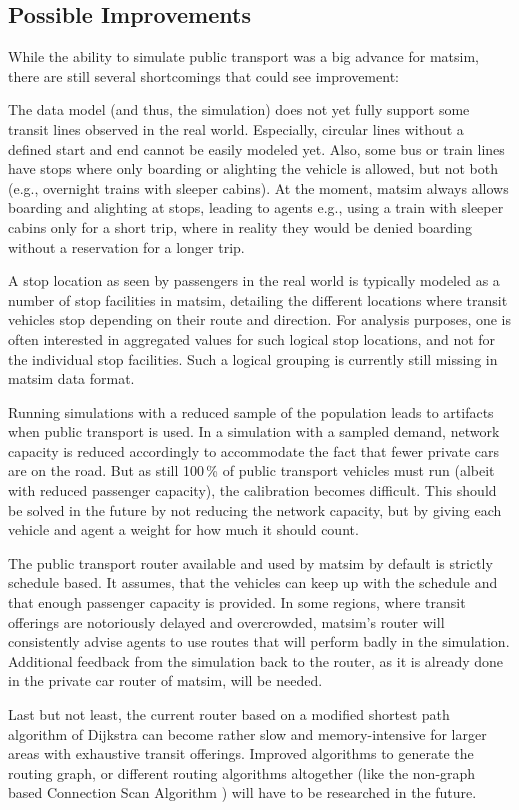 \subsection{Possible Improvements}
While the ability to simulate public transport was a big advance for \gls{matsim},
there are still several shortcomings that could see improvement:
%
\begin{compactitem}
	\item The data model (and thus, the simulation) does not yet fully support some
	transit lines observed in the real world. Especially, circular lines without a
	defined start and end cannot be easily modeled yet. Also, some bus or
	train lines have stops where only boarding or alighting the vehicle is allowed,
	but not both (e.g., overnight trains with sleeper cabins). At the moment, \gls{matsim}
	always allows boarding and alighting at stops, leading to agents e.g., using a
	train with sleeper cabins only for a short trip, where in reality they would be
	denied boarding without a reservation for a longer trip.
	\item A stop location as seen by passengers in the real world is
	typically modeled as a number of stop facilities in \gls{matsim}, detailing the
	different locations where transit vehicles stop depending on their route and
	direction. For analysis purposes, one is often interested in aggregated values
	for such logical stop locations, and not for the individual stop facilities.
	Such a logical grouping is currently still missing in \gls{matsim} data format.
	\item Running simulations with a reduced sample of the population leads to
	artifacts when public transport is used. In a simulation with a sampled demand,
	network capacity is reduced accordingly to accommodate the fact that fewer
	private cars are on the road. But as still 100\,\% of public transport vehicles
	must run (albeit with reduced passenger capacity), the calibration becomes
	difficult. This should be solved in the future by not reducing the network
	capacity, but by giving each vehicle and agent a weight for how much it should
	count.
	\item The public transport router available and used by \gls{matsim} by default is
	strictly schedule based. It assumes, that the vehicles can keep up with the
	schedule and that enough passenger capacity is provided. In some regions, where
	transit offerings are notoriously delayed and overcrowded, \gls{matsim}'s router will
	consistently advise agents to use routes that will perform badly in the
	simulation. Additional feedback from the simulation back to the router, as it
	is already done in the private car router of \gls{matsim}, will be needed.
	\item Last but not least, the current router based on a modified shortest path
	algorithm of Dijkstra can become rather slow and memory-intensive for
	larger areas with exhaustive transit offerings. Improved algorithms to generate
	the routing graph, or different routing algorithms altogether (like the
	non-graph based Connection Scan Algorithm
	\citep{DibbeltEtAl_BonifaciEtAl_2013}) will have to be researched in the
	future.
\end{compactitem}

